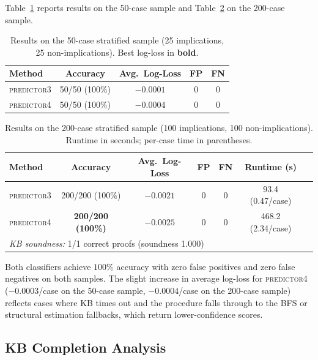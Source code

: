 Table~\ref{tab:50case} reports results on the 50-case sample and
Table~\ref{tab:200case} on the 200-case sample.

\begin{table}[ht]
\centering
\caption{Results on the 50-case stratified sample (25 implications, 25 non-implications).
Best log-loss in \textbf{bold}.}
\label{tab:50case}
\renewcommand{\arraystretch}{1.1}
\begin{tabular}{@{}lcccc@{}}
\toprule
\textbf{Method} & \textbf{Accuracy} & \textbf{Avg.\ Log-Loss} & \textbf{FP} & \textbf{FN} \\
\midrule
\textsc{predictor3} & 50/50 (100\%) & \textbf{$-0.0001$} & 0 & 0 \\
\textsc{predictor4} & 50/50 (100\%) & $-0.0004$ & 0 & 0 \\
\bottomrule
\end{tabular}
\end{table}

\begin{table}[ht]
\centering
\caption{Results on the 200-case stratified sample (100 implications, 100 non-implications).
Runtime in seconds; per-case time in parentheses.}
\label{tab:200case}
\renewcommand{\arraystretch}{1.1}
\begin{tabular}{@{}lcccccc@{}}
\toprule
\textbf{Method} & \textbf{Accuracy} & \textbf{Avg.\ Log-Loss} & \textbf{FP} & \textbf{FN}
  & \textbf{Runtime (s)} \\
\midrule
\textsc{predictor3} & 200/200 (100\%) & $-0.0021$ & 0 & 0 & 93.4 (0.47/case) \\
\textsc{predictor4} & \textbf{200/200 (100\%)} & $-0.0025$ & 0 & 0 & 468.2 (2.34/case) \\
\midrule
\multicolumn{5}{l}{\textit{KB soundness:} 1/1 correct proofs (soundness 1.000)} \\
\bottomrule
\end{tabular}
\end{table}

Both classifiers achieve $100\%$ accuracy with zero false positives and zero false
negatives on both samples.  The slight increase in average log-loss for
\textsc{predictor4} ($-0.0003$/case on the 50-case sample, $-0.0004$/case on the
200-case sample) reflects cases where KB times out and the procedure falls through to
the BFS or structural estimation fallbacks, which return lower-confidence scores.

\subsection{KB Completion Analysis}

